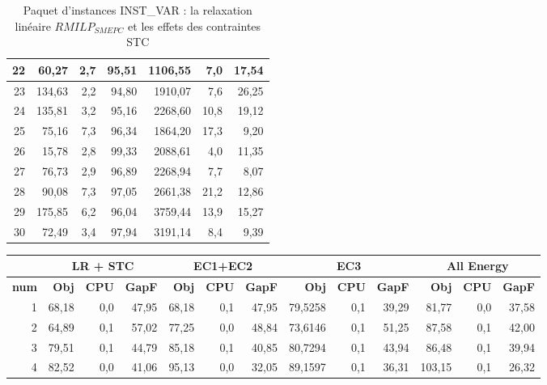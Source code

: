 {\begin{table}[H]
\begin{tabular}{|r|rrr|rrr|}
	22	&	60,27	&	2,7	&	95,51	&	1106,55	&	7,0	&	17,54	\\ \hline
	23	&	134,63	&	2,2	&	94,80	&	1910,07	&	7,6	&	26,25	\\ \hline
	24	&	135,81	&	3,2	&	95,16	&	2268,60	&	10,8	&	19,12	\\ \hline
	25	&	75,16	&	7,3	&	96,34	&	1864,20	&	17,3	&	9,20	\\ \hline
	26	&	15,78	&	2,8	&	99,33	&	2088,61	&	4,0	&	11,35	\\ \hline
	27	&	76,73	&	2,9	&	96,89	&	2268,94	&	7,7	&	8,07	\\ \hline
	28	&	90,08	&	7,3	&	97,05	&	2661,38	&	21,2	&	12,86	\\ \hline
	29	&	175,85	&	6,2	&	96,04	&	3759,44	&	13,9	&	15,27	\\ \hline
	30	&	72,49	&	3,4	&	97,94	&	3191,14	&	8,4	&	9,39	\\ \hline
		\bottomrule
	\end{tabular}%
	\caption[Impact des contraintes STC sur les résultats de \textit{$RMILP_{SMEPC}$} sur INST\_VAR]{Paquet d'instances INST\_VAR : la relaxation linéaire \textit{$RMILP_{SMEPC}$} et les effets des contraintes STC}
	\label{tab:frac1}%
\end{table}%
\begin{table}[H]
	\centering
	\small
	\begin{tabular}{|r|rrr|rrr|rrr|rrr|}
		\toprule
		\hline
		\rowcolor{cyan}	&\multicolumn{3}{c|}{\textbf{LR + STC}} & \multicolumn{3}{c|}{\textbf{EC1+EC2}}&\multicolumn{3}{c|}{\textbf{EC3}}&\multicolumn{3}{c|}{\textbf{All Energy}} \\ \hline
		\midrule
		\rowcolor{cyan}	\textbf{num} & \textbf{Obj} & \textbf{CPU} & \textbf{GapF} & \textbf{Obj} & \textbf{CPU}  & \textbf{GapF} & \textbf{Obj} & \textbf{CPU} &  \textbf{GapF} &\textbf{Obj} & \textbf{CPU} & \textbf{GapF} \\ \hline
		\midrule
		1	&	68,18	&	0,0	&	47,95	&	68,18	&	0,1	&	47,95	&	79,5258	&	0,1	&	39,29	&	81,77	&	0,0	&	37,58	\\ \hline
		2	&	64,89	&	0,1	&	57,02	&	77,25	&	0,0	&	48,84	&	73,6146	&	0,1	&	51,25	&	87,58	&	0,1	&	42,00	\\ \hline
		3	&	79,51	&	0,1	&	44,79	&	85,18	&	0,1	&	40,85	&	80,7294	&	0,1	&	43,94	&	86,48	&	0,1	&	39,94	\\ \hline
		4	&	82,52	&	0,0	&	41,06	&	95,13	&	0,0	&	32,05	&	89,1597	&	0,1	&	36,31	&	103,15	&	0,1	&	26,32	\\ \hline

\end{tabular}
\end{table}}

